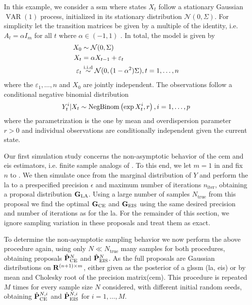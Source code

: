 \begin{example}
    \label{ex:negbinom-ar1}
    In this example, we consider a \gls{ssm} where states $X_{t}$ follow a stationary Gaussian $\operatorname{VAR}(1)$ process, initialized in its stationary distribution $\mathcal N(0,\Sigma)$. For simplicity let the transition matrices be given by a multiple of the identity, i.e. $A_{t} = \alpha I_{m}$ for all $t$ where $\alpha \in (-1, 1)$ . 
    In total, the model is given by
    \begin{align*}
    X_{0} &\sim \mathcal N(0,\Sigma) \\
    X_{t} &= \alpha X_{t - 1} + \varepsilon_{t}\\
    \varepsilon_t &\stackrel{\text{i.i.d}}{\sim} \mathcal N(0, (1 - \alpha^{2})\Sigma), t = 1, \dots, n
    \end{align*}
    where the $\varepsilon_{1}, \dots, n$ and $X_{0}$ are jointly independent. The observations follow a conditional negative binomial distribution 
    $$
    Y^{i}_{t} | X_{t} \sim \operatorname{NegBinom} \left( \exp{X^{i}_{t}}, r \right), i = 1, \dots, p
    $$
    where the parametrization is the one by mean and overdispersion parameter $r > 0$  and individual observations are conditionally independent given the current state.
\end{example}


Our first simulation study concerns the non-asymptotic behavior of the \gls{cem} and \gls{eis} estimators, i.e. finite sample analogs of . To this end,
we let $m = 1$ in  and fix $n$ to . 
We then simulate once from the marginal distribution of $Y$ and perform the \gls{la} to a prespecified precision $\epsilon$ and maximum number of iterations $n_{\text{iter}}$, obtaining a proposal distribution $\mathbf G_{{\text{LA}}}$. Using a large number of samples $N_{\text{true}}$ from this proposal we find the optimal $\mathbf G_{{\text{CE}}}$ and $\mathbf G_{{\text{EIS}}}$ using the same desired precision and number of iterations as for the \gls{la}. For the remainder of this section, we ignore sampling variation in these proposals and treat them as exact. 

To determine the non-asymptotic sampling behavior we now perform the above procedure again, using only $N \ll N_{\text{true}}$ many samples for both procedures, obtaining proposals $\hat{\mathbf P}^{N}_{{\text{CE}}}$ and $\hat {\mathbf P}^{N}_{{\text{EIS}}}$. As the full proposals are Gaussian distributions on $\mathbf R^{(n+1)\times m}$, either given as the posterior of a \gls{glssm} (\gls{la}, \gls{eis}) or by mean and Cholesky root of the precision matrix(\gls{cem}). 
This procedure is repeated $M$ times for every sample size $N$ considered, with different initial random seeds, obtaining $\hat{\mathbf P}^{N,i}_{{\text{CE}}}$ and $\hat {\mathbf P}^{N,i}_{{\text{EIS}}}$ for $i = 1, \dots, M$.

